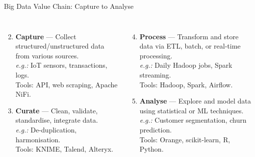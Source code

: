 \documentclass[aspectratio=169, table]{beamer}
\begin{document}
	
	\begin{frame}[fragile]{Big Data Value Chain: Capture to Analyse}
		\vspace{20pt}
		\begin{columns}[T]
			\begin{enumerate}
				\setcounter{enumi}{1}
				
				\item \textbf{Capture} — Collect structured/unstructured data from various sources.\\
				\textit{e.g.:} IoT sensors, transactions, logs.\\
				Tools: API, web scraping, Apache NiFi.
				
				\item \textbf{Curate} — Clean, validate, standardise, integrate data.\\
				\textit{e.g.:} De-duplication, harmonisation.\\
				Tools: KNIME, Talend, Alteryx.
			\end{enumerate}
			
			\begin{enumerate}
				\setcounter{enumi}{3}
				
				
				
				\item \textbf{Process} — Transform and store data via ETL, batch, or real-time processing.\\
				\textit{e.g.:} Daily Hadoop jobs, Spark streaming.\\
				Tools: Hadoop, Spark, Airflow.
				
				\item \textbf{Analyse} — Explore and model data using statistical or ML techniques.\\
				\textit{e.g.:} Customer segmentation, churn prediction.\\
				Tools: Orange, scikit-learn, R, Python.
			\end{enumerate}
		\end{columns}
	\end{frame}
	
\end{document}
